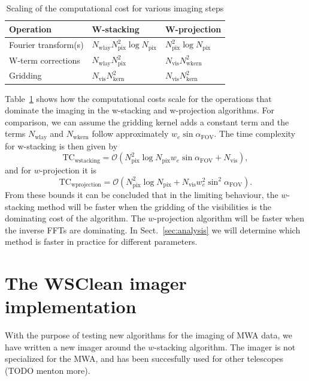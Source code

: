 \documentclass[useAMS,usenatbib]{mn2e}
\begin{document}
\begin{table}
 \caption{Scaling of the computational cost for various imaging steps} \label{tbl:computational-cost-per-operation}
 \begin{tabular}{lll}
   \textbf{Operation} & \textbf{W-stacking} & \textbf{W-projection} \\
   \hline\hline
   Fourier transform(s) & $N_\textrm{wlay} N^2_\textrm{pix} \log N_\textrm{pix}$ & $N^2_\textrm{pix} \log N_\textrm{pix}$ \\
   W-term corrections   & $N_\textrm{wlay} N^2_\textrm{pix}$ & $N_\textrm{vis} N^2_\textrm{wkern}$ \\
   Gridding & $N_\textrm{vis}N^2_\textrm{kern}$ & $N_\textrm{vis} N_\textrm{kern}^2$ \\
   \hline\hline
 \end{tabular}
\end{table}

Table~\ref{tbl:computational-cost-per-operation} shows how the computational costs scale for the operations that dominate the imaging in the w-stacking and w-projection algorithms. For comparison, we can assume the gridding kernel adds a constant term and the terms $N_\textrm{wlay}$ and $N_\textrm{wkern}$ follow approximately $w_e \sin \alpha_\textrm{FOV}$. The time complexity for w-stacking is then given by
\begin{equation}
\textrm{TC}_\textrm{wstacking}=\mathcal{O}\left(N^2_\textrm{pix} \log N_\textrm{pix} w_e \sin \alpha_\textrm{FOV}+ N_\textrm{vis} \right),
\end{equation}
and for $w$-projection it is
\begin{equation}
\textrm{TC}_\textrm{wprojection}=\mathcal{O}\left(N^2_\textrm{pix} \log N_\textrm{pix} + N_\textrm{vis} w_e^2 \sin^2 \alpha_\textrm{FOV}\right).
\end{equation}
From these bounds it can be concluded that in the limiting behaviour, the $w$-stacking method will be faster when the gridding of the visibilities is the dominating cost of the algorithm. The $w$-projection algorithm will be faster when the inverse FFTs are dominating. In Sect.~\ref{sec:analysis} we will determine which method is faster in practice for different parameters.

\section{The WSClean imager implementation} \label{sec:implementation}
With the purpose of testing new algorithms for the imaging of MWA data, we have written a new imager around the $w$-stacking algorithm. The imager is not specialized for the MWA, and has been succesfully used for other telescopes (TODO menton more).
\end{document}
